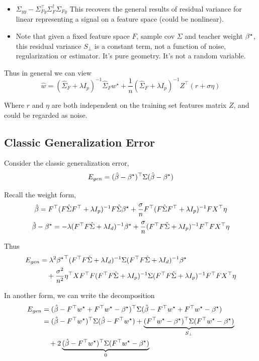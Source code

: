 \begin{itemize}
\item $\Sigma_{yy}-\Sigma_{Fy}^{\top}\Sigma_{F}^{\dagger}\Sigma_{Fy}$ This
recovers the general results of residual variance for linear representing
a signal on a feature space (could be nonlinear).
\item Note that given a fixed feature space $F$, sample cov $\Sigma$ and
teacher weight ${\beta^{\star}}$, this residual variance $S_{\perp}$
is a constant term, not a function of noise, regularization or estimator.
It's pure geometry. It's not a random variable.
\end{itemize}
Thus in general we can view
\begin{equation}
\hat{w}=(\hat{\Sigma}_{F}+\lambda I_{p})^{-1}\hat{\Sigma}_{F}w^{\star}+\frac{1}{n}(\hat{\Sigma}_{F}+\lambda I_{p})^{-1}Z^{\top}(r+\sigma\eta)\label{eq:feat-regr-non-repr-as-noise-decomp}
\end{equation}

Where $r$ and $\eta$ are both independent on the training set features
matrix $Z$, and could be regarded as noise.

\subsection{Classic Generalization Error}

Consider the classic generalization error,
\[
E_{gen}=(\hat{\beta}-{\beta^{\star}})^{\top}\Sigma(\hat{\beta}-{\beta^{\star}})
\]

Recall the weight form,
\[
\hat{\beta}=F^{\top}(F\hat{\Sigma}F^{\top}+\lambda I_{p})^{-1}F\hat{\Sigma}{\beta^{\star}}+\frac{\sigma}{n}F^{\top}(F\hat{\Sigma}F^{\top}+\lambda I_{p})^{-1}FX^{\top}\eta
\]
\[
\hat{\beta}-{\beta^{\star}}=-\lambda(F^{\top}F\hat{\Sigma}+\lambda I_{d})^{-1}{\beta^{\star}}+\frac{\sigma}{n}(F^{\top}F\hat{\Sigma}+\lambda I_{p})^{-1}F^{\top}FX^{\top}\eta
\]

Thus
\begin{align*}
E_{gen} & =\lambda^{2}{{\beta^{\star}}}^{\top}(F^{\top}F\hat{\Sigma}+\lambda I_{d})^{-1}\Sigma(F^{\top}F\hat{\Sigma}+\lambda I_{d})^{-1}{\beta^{\star}}\\
 & \quad+\frac{\sigma^{2}}{n^{2}}\eta^{\top}XF^{\top}F(F^{\top}F\hat{\Sigma}+\lambda I_{p})^{-1}\Sigma(F^{\top}F\hat{\Sigma}+\lambda I_{p})^{-1}F^{\top}FX^{\top}\eta
\end{align*}

In another form, we can write the decomposition
\begin{align*}
E_{gen} & =(\hat{\beta}-F^{\top}w^{\star}+F^{\top}w^{\star}-{\beta^{\star}})^{\top}\Sigma(\hat{\beta}-F^{\top}w^{\star}+F^{\top}w^{\star}-{\beta^{\star}})\\
 & =(\hat{\beta}-F^{\top}w^{\star})^{\top}\Sigma(\hat{\beta}-F^{\top}w^{\star})+\underbrace{(F^{\top}w^{\star}-{\beta^{\star}})^{\top}\Sigma(F^{\top}w^{\star}-{\beta^{\star}})}_{S_{\perp}}\\
 & \quad+2\underbrace{(\hat{\beta}-F^{\top}w^{\star})^{\top}\Sigma(F^{\top}w^{\star}-{\beta^{\star}})}_{0}
\end{align*}

